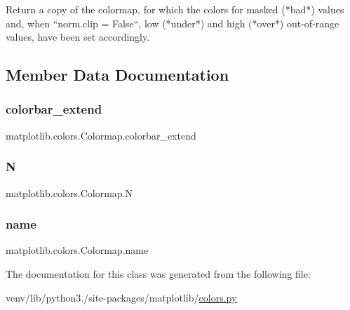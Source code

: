 \begin{DoxyVerb}Return a copy of the colormap, for which the colors for masked (*bad*)
values and, when ``norm.clip = False``, low (*under*) and high (*over*)
out-of-range values, have been set accordingly.
\end{DoxyVerb}
 

\subsection{Member Data Documentation}
\mbox{\label{classmatplotlib_1_1colors_1_1Colormap_ab6d5f011a6654b435e6ec4b369202353}} 
\subsubsection{\texorpdfstring{colorbar\+\_\+extend}{colorbar\_extend}}
{\footnotesize\ttfamily matplotlib.\+colors.\+Colormap.\+colorbar\+\_\+extend}

\mbox{\label{classmatplotlib_1_1colors_1_1Colormap_a011f75e2d28856dd18ada18febb2bb26}} 
\subsubsection{\texorpdfstring{N}{N}}
{\footnotesize\ttfamily matplotlib.\+colors.\+Colormap.\+N}

\mbox{\label{classmatplotlib_1_1colors_1_1Colormap_aa816ba9aebc8d8438ca791c82bb6198c}} 
\subsubsection{\texorpdfstring{name}{name}}
{\footnotesize\ttfamily matplotlib.\+colors.\+Colormap.\+name}



The documentation for this class was generated from the following file\+:\begin{DoxyCompactItemize}
\item 
venv/lib/python3./site-\/packages/matplotlib/\hyperlink{colors_8py}{colors.\+py}\end{DoxyCompactItemize}
